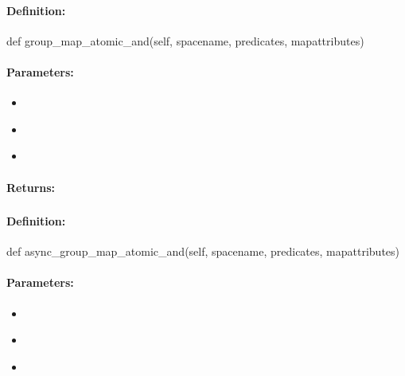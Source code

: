 \paragraph{Definition:}
\begin{pythoncode}
def group_map_atomic_and(self, spacename, predicates, mapattributes)
\end{pythoncode}

\paragraph{Parameters:}
\begin{itemize}[noitemsep]
\item {}\\

\item {}\\

\item {}\\

\end{itemize}

\paragraph{Returns:}


\pagebreak
\subsubsection{}
\label{api:python:async_group_map_atomic_and}


\paragraph{Definition:}
\begin{pythoncode}
def async_group_map_atomic_and(self, spacename, predicates, mapattributes)
\end{pythoncode}

\paragraph{Parameters:}
\begin{itemize}[noitemsep]
\item {}\\

\item {}\\

\item {}\\

\end{itemize}

